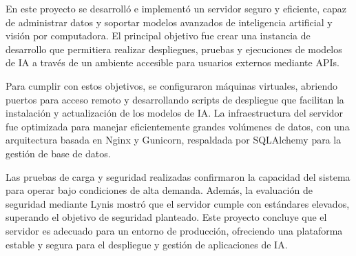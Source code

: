 En este proyecto se desarrolló e implementó un servidor seguro y eficiente, capaz de administrar datos y soportar modelos avanzados de inteligencia artificial y visión por computadora. El principal objetivo fue crear una instancia de desarrollo que permitiera realizar despliegues, pruebas y ejecuciones de modelos de IA a través de un ambiente accesible para usuarios externos mediante APIs.

Para cumplir con estos objetivos, se configuraron máquinas virtuales, abriendo puertos para acceso remoto y desarrollando scripts de despliegue que facilitan la instalación y actualización de los modelos de IA. La infraestructura del servidor fue optimizada para manejar eficientemente grandes volúmenes de datos, con una arquitectura basada en Nginx y Gunicorn, respaldada por SQLAlchemy para la gestión de base de datos.

Las pruebas de carga y seguridad realizadas confirmaron la capacidad del sistema para operar bajo condiciones de alta demanda. Además, la evaluación de seguridad mediante Lynis mostró que el servidor cumple con estándares elevados, superando el objetivo de seguridad planteado. Este proyecto concluye que el servidor es adecuado para un entorno de producción, ofreciendo una plataforma estable y segura para el despliegue y gestión de aplicaciones de IA.
